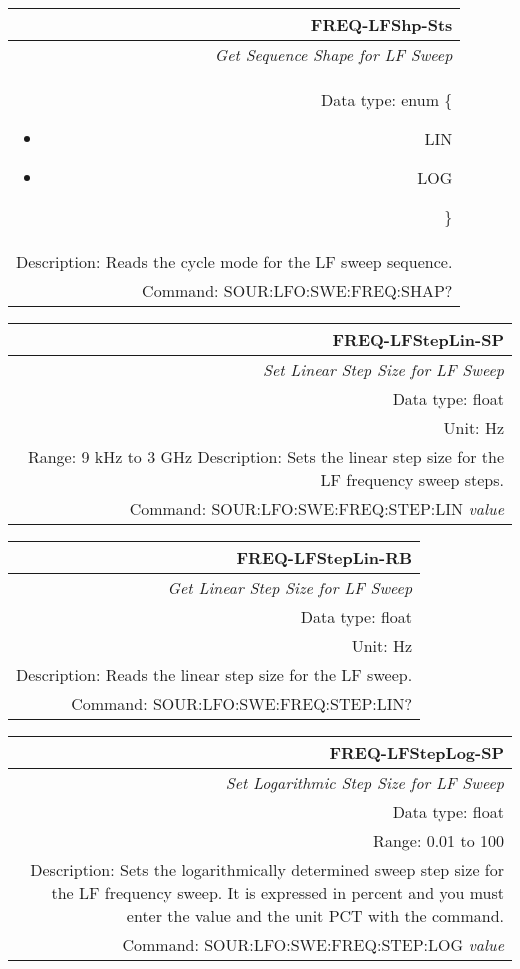 \documentclass[openany]{article}
\begin{document}
		\begin{tabular}{N}
			\hline
			\bfseries FREQ-LFShp-Sts \\ \hline
			\emph{Get Sequence Shape for LF Sweep} \\
			Data type: enum \{\begin{itemize}[noitemsep]
				\small
				\item[] LIN
				\item[] LOG
			\end{itemize}\} \\ 
			Description: Reads the cycle mode for the LF sweep sequence. \\
			Command: SOUR:LFO:SWE:FREQ:SHAP? \\

		\end{tabular}
%
		\begin{tabular}{N}
			\hline
			\bfseries FREQ-LFStepLin-SP \\ \hline
			\emph{Set Linear Step Size for LF Sweep} \\
			Data type: float \\
			Unit: Hz \\ 
			Range: 9 kHz to 3 GHz
			Description: Sets the linear step size for the LF frequency sweep steps.\\
			Command: SOUR:LFO:SWE:FREQ:STEP:LIN \emph{value} \\
			
		\end{tabular}


		\begin{tabular}{N}
			\hline
			\bfseries FREQ-LFStepLin-RB \\ \hline
			\emph{Get Linear Step Size for LF Sweep} \\
			Data type: float \\
			Unit: Hz \\
			Description: Reads the linear step size for the LF sweep. \\
			Command: SOUR:LFO:SWE:FREQ:STEP:LIN? \\

		\end{tabular}
%
		\begin{tabular}{N}
			\hline
			\bfseries FREQ-LFStepLog-SP \\ \hline
			\emph{Set Logarithmic Step Size for LF Sweep} \\
			Data type: float \\
			Range: 0.01 to 100 \\
			Description: Sets the logarithmically determined sweep step size for the LF frequency sweep. It is expressed in percent and you must enter the value and the unit PCT with the command.\\
			Command: SOUR:LFO:SWE:FREQ:STEP:LOG \emph{value} \\
			
		\end{tabular}
\end{document}
